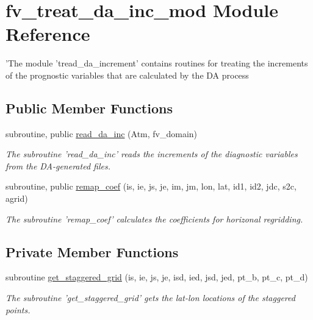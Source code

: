 \section{fv\-\_\-treat\-\_\-da\-\_\-inc\-\_\-mod Module Reference}
\label{classfv__treat__da__inc__mod}


'The module 'tread\-\_\-da\-\_\-increment' contains routines for treating the increments of the prognostic variables that are calculated by the D\-A process  


\subsection*{Public Member Functions}
\begin{DoxyCompactItemize}
\item 
subroutine, public \hyperlink{classfv__treat__da__inc__mod_ac66445c077dd28df36cfab95f359e2ff}{read\-\_\-da\-\_\-inc} (Atm, fv\-\_\-domain)
\begin{DoxyCompactList}\small\item\em The subroutine 'read\-\_\-da\-\_\-inc' reads the increments of the diagnostic variables from the D\-A-\/generated files. \end{DoxyCompactList}\item 
subroutine, public \hyperlink{classfv__treat__da__inc__mod_a85d0bdb9943d36158fd0a5834e639e6b}{remap\-\_\-coef} (is, ie, js, je, im, jm, lon, lat, id1, id2, jdc, s2c, agrid)
\begin{DoxyCompactList}\small\item\em The subroutine 'remap\-\_\-coef' calculates the coefficients for horizonal regridding. \end{DoxyCompactList}\end{DoxyCompactItemize}
\subsection*{Private Member Functions}
\begin{DoxyCompactItemize}
\item 
subroutine \hyperlink{classfv__treat__da__inc__mod_a603fb0f1b1bda4076d742b12e7cc7cc0}{get\-\_\-staggered\-\_\-grid} (is, ie, js, je, isd, ied, jsd, jed, pt\-\_\-b, pt\-\_\-c, pt\-\_\-d)
\begin{DoxyCompactList}\small\item\em The subroutine 'get\-\_\-staggered\-\_\-grid' gets the lat-\/lon locations of the staggered points. \end{DoxyCompactList}\end{DoxyCompactItemize}


